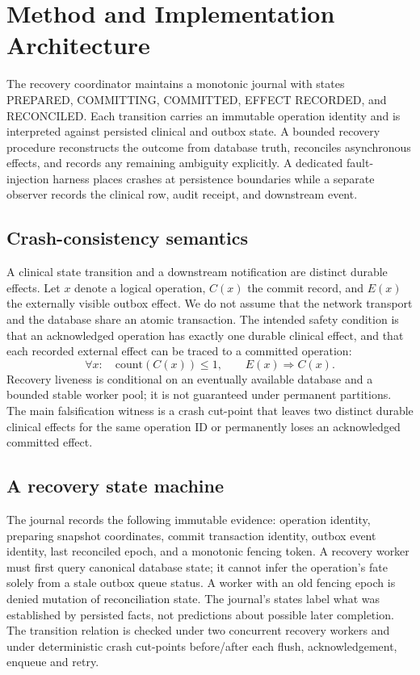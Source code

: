 \documentclass[11pt,a4paper]{article}
\begin{document}
\section{Method and Implementation Architecture}
The recovery coordinator maintains a monotonic journal with states PREPARED, COMMITTING, COMMITTED, EFFECT RECORDED, and RECONCILED. Each transition carries an immutable operation identity and is interpreted against persisted clinical and outbox state. A bounded recovery procedure reconstructs the outcome from database truth, reconciles asynchronous effects, and records any remaining ambiguity explicitly. A dedicated fault-injection harness places crashes at persistence boundaries while a separate observer records the clinical row, audit receipt, and downstream event.

\subsection{Crash-consistency semantics}
A clinical state transition and a downstream notification are distinct durable effects. Let $x$ denote a logical operation, $C(x)$ the commit record, and $E(x)$ the externally visible outbox effect. We do not assume that the network transport and the database share an atomic transaction. The intended safety condition is that an acknowledged operation has exactly one durable clinical effect, and that each recorded external effect can be traced to a committed operation:
\begin{equation}
  \forall x:\quad \mathrm{count}(C(x))\leq 1,\qquad E(x)\Rightarrow C(x).
\end{equation}
Recovery liveness is conditional on an eventually available database and a bounded stable worker pool; it is not guaranteed under permanent partitions. The main falsification witness is a crash cut-point that leaves two distinct durable clinical effects for the same operation ID or permanently loses an acknowledged committed effect.

\subsection{A recovery state machine}
The journal records the following immutable evidence: operation identity, preparing snapshot coordinates, commit transaction identity, outbox event identity, last reconciled epoch, and a monotonic fencing token. A recovery worker must first query canonical database state; it cannot infer the operation's fate solely from a stale outbox queue status. A worker with an old fencing epoch is denied mutation of reconciliation state. The journal's states label what was established by persisted facts, not predictions about possible later completion. The transition relation is checked under two concurrent recovery workers and under deterministic crash cut-points before/after each flush, acknowledgement, enqueue and retry.
\end{document}
